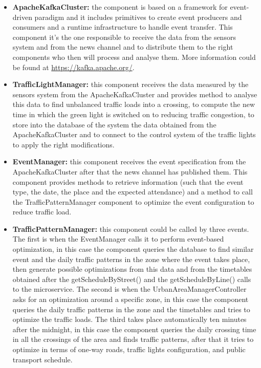 \documentclass[12pt, a4paper, twoside, openright]{report}
\begin{document}
\begin{itemize}
\item
  \textbf{ApacheKafkaCluster:} the component is based on a framework for
  event-driven paradigm and it includes primitives to create event
  producers and consumers and a runtime infrastructure to handle event
  transfer. This component it's the one responsible to receive the data
  from the sensors system and from the news channel and to distribute
  them to the right components who then will process and analyse them.
  More information could be found at \url{https://kafka.apache.org/}.
\item
  \textbf{TrafficLightManager:} this component receives the data
  measured by the sensors system from the ApacheKafkaCluster and
  provides method to analyse this data to find unbalanced traffic loads
  into a crossing, to compute the new time in which the green light is
  switched on to reducing traffic congestion, to store into the database
  of the system the data obtained from the ApacheKafkaCluster and to
  connect to the control system of the traffic lights to apply the right
  modifications.
\item
  \textbf{EventManager:} this component receives the event specification
  from the ApacheKafkaCluster after that the news channel has published
  them. This component provides methods to retrieve information (such
  that the event type, the date, the place and the expected attendance)
  and a method to call the TrafficPatternManager component to optimize
  the event configuration to reduce traffic load.
\item
  \textbf{TrafficPatternManager:} this component could be called by
  three events. The first is when the EventManager calls it to perform
  event-based optimization, in this case the component queries the
  database to find similar event and the daily traffic patterns in the
  zone where the event takes place, then generate possible optimizations
  from this data and from the timetables obtained after the
  getScheduleByStreet() and the getScheduleByLine() calls to the
  microservice. The second is when the UrbanAreaManagerController asks
  for an optimization around a specific zone, in this case the component
  queries the daily traffic patterns in the zone and the timetables and
  tries to optimize the traffic loads. The third takes place
  automatically ten minutes after the midnight, in this case the
  component queries the daily crossing time in all the crossings of the
  area and finds traffic patterns, after that it tries to optimize in
  terms of one-way roads, traffic lights configuration, and public
  transport schedule.
\end{itemize}
\end{document}
